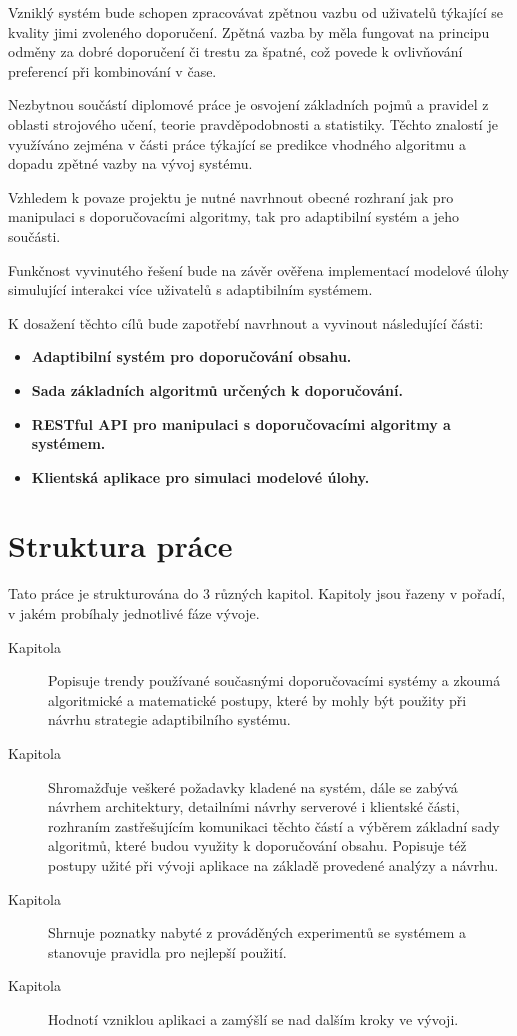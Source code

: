 \documentclass[thesis=M,czech]{FITthesis}[2014/05/07]
\begin{document}
\begin{introduction}
	Vzniklý systém bude schopen zpracovávat zpětnou vazbu od uživatelů týkající se kvality jimi zvoleného doporučení. Zpětná vazba by měla fungovat na principu odměny za dobré doporučení či trestu za špatné, což povede k ovlivňování preferencí při kombinování v čase.
		
	Nezbytnou součástí diplomové práce je osvojení základních pojmů a pravidel z oblasti strojového učení, teorie pravděpodobnosti a statistiky. Těchto znalostí je využíváno zejména v části práce týkající se predikce vhodného algoritmu a dopadu zpětné vazby na vývoj systému. 
	
	Vzhledem k povaze projektu je nutné navrhnout obecné rozhraní jak pro manipulaci s doporučovacími algoritmy, tak pro adaptibilní systém a jeho součásti.
	
	Funkčnost vyvinutého řešení bude na závěr ověřena implementací modelové úlohy simulující interakci více uživatelů s adaptibilním systémem. 
	
	K dosažení těchto cílů bude zapotřebí navrhnout a vyvinout následující části:

\begin{itemize}
  \item \textbf{Adaptibilní systém pro doporučování obsahu.}
  \item \textbf{Sada základních algoritmů určených k doporučování.}
  \item \textbf{RESTful API pro manipulaci s doporučovacími algoritmy a systémem.}
  \item \textbf{Klientská aplikace pro simulaci modelové úlohy.}  
\end{itemize}	

\section{Struktura práce}
\label{sec:structure}
	Tato práce je strukturována do 3 různých kapitol. Kapitoly jsou řazeny v pořadí, v jakém probíhaly jednotlivé fáze vývoje.	

\begin{description}
  \item[Kapitola ] Popisuje trendy používané současnými doporučovacími systémy a zkoumá algoritmické a matematické postupy, které by mohly být použity při návrhu strategie adaptibilního systému.
  \item[Kapitola ] Shromažďuje veškeré požadavky kladené na systém, dále se zabývá návrhem architektury, detailními návrhy serverové i klientské části, rozhraním zastřešujícím komunikaci těchto částí a výběrem základní sady algoritmů, které budou využity k doporučování obsahu. Popisuje též postupy užité při vývoji aplikace na základě provedené analýzy a návrhu.
  \item[Kapitola ] Shrnuje poznatky nabyté z prováděných experimentů se systémem a stanovuje pravidla pro nejlepší použití.
  \item[Kapitola ] Hodnotí vzniklou aplikaci a zamýšlí se nad dalším kroky ve vývoji.
\end{description}
	
\end{introduction}
\end{document}
